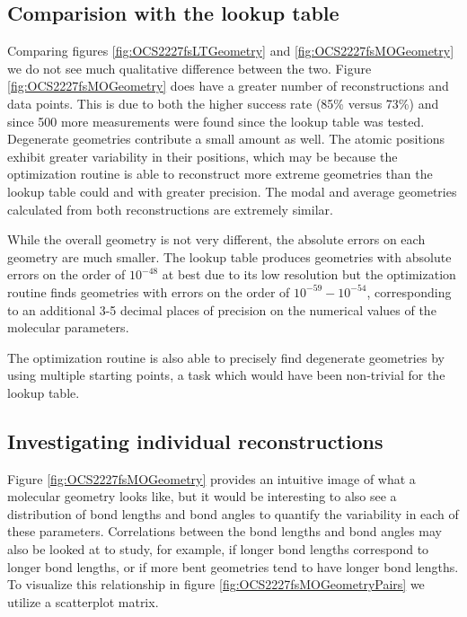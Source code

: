 
\subsection{Comparision with the lookup table}
Comparing figures \ref{fig:OCS2227fsLTGeometry} and \ref{fig:OCS2227fsMOGeometry} we do not see much qualitative difference between the two. Figure \ref{fig:OCS2227fsMOGeometry} does have a greater number of reconstructions and data points. This is due to both the higher success rate (85\% versus 73\%) and since 500 more measurements were found since the lookup table was tested. Degenerate geometries contribute a small amount as well. The atomic positions exhibit greater variability in their positions, which may be because the optimization routine is able to reconstruct more extreme geometries than the lookup table could and with greater precision. The modal and average geometries calculated from both reconstructions are extremely similar.

While the overall geometry is not very different, the absolute errors on each geometry are much smaller. The lookup table produces geometries with absolute errors on the order of $10^{-48}$ at best due to its low resolution but the optimization routine finds geometries with errors on the order of $10^{-59} - 10^{-54}$, corresponding to an additional 3-5 decimal places of precision on the numerical values of the molecular parameters.

The optimization routine is also able to precisely find degenerate geometries by using multiple starting points, a task which would have been non-trivial for the lookup table.

\subsection{Investigating individual reconstructions} \label{ssec:weirdBonds}
Figure \ref{fig:OCS2227fsMOGeometry} provides an intuitive image of what a molecular geometry looks like, but it would be interesting to also see a distribution of bond lengths and bond angles to quantify the variability in each of these parameters. Correlations between the bond lengths and bond angles may also be looked at to study, for example, if longer  bond lengths correspond to longer  bond lengths, or if more bent geometries tend to have longer bond lengths. To visualize this relationship in figure \ref{fig:OCS2227fsMOGeometryPairs} we utilize a scatterplot matrix.

